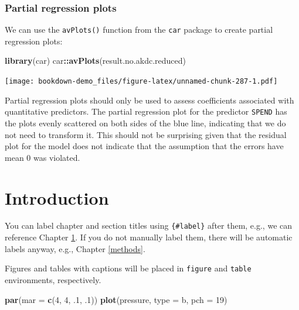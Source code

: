 \documentclass[
]{book}
\newenvironment{Shaded}{\begin{snugshade}}{\end{snugshade}}
\newcommand{\AttributeTok}[1]{\textcolor[rgb]{0.13,0.29,0.53}{#1}}
\newcommand{\DecValTok}[1]{\textcolor[rgb]{0.00,0.00,0.81}{#1}}
\newcommand{\FunctionTok}[1]{\textcolor[rgb]{0.13,0.29,0.53}{\textbf{#1}}}
\newcommand{\NormalTok}[1]{#1}
\newcommand{\SpecialCharTok}[1]{\textcolor[rgb]{0.81,0.36,0.00}{\textbf{#1}}}
\newcommand{\StringTok}[1]{\textcolor[rgb]{0.31,0.60,0.02}{#1}}
\begin{document}
\hypertarget{partial-regression-plots-1}{%
\subsection*{Partial regression plots}\label{partial-regression-plots-1}}

We can use the \texttt{avPlots()} function from the \texttt{car} package to create partial regression plots:

\begin{Shaded}
\begin{Highlighting}[]
\FunctionTok{library}\NormalTok{(car)}
\NormalTok{car}\SpecialCharTok{::}\FunctionTok{avPlots}\NormalTok{(result.no.akdc.reduced)}
\end{Highlighting}
\end{Shaded}

\texttt{[image: bookdown-demo\_files/figure-latex/unnamed-chunk-287-1.pdf]}

Partial regression plots should only be used to assess coefficients associated with quantitative predictors. The partial regression plot for the predictor \texttt{SPEND} has the plots evenly scattered on both sides of the blue line, indicating that we do not need to transform it. This should not be surprising given that the residual plot for the model does not indicate that the assumption that the errors have mean 0 was violated.

\hypertarget{intro}{%
\chapter{Introduction}\label{intro}}

You can label chapter and section titles using \texttt{\{\#label\}} after them, e.g., we can reference Chapter \ref{intro}. If you do not manually label them, there will be automatic labels anyway, e.g., Chapter \ref{methods}.

Figures and tables with captions will be placed in \texttt{figure} and \texttt{table} environments, respectively.

\begin{Shaded}
\begin{Highlighting}[]
\FunctionTok{par}\NormalTok{(}\AttributeTok{mar =} \FunctionTok{c}\NormalTok{(}\DecValTok{4}\NormalTok{, }\DecValTok{4}\NormalTok{, .}\DecValTok{1}\NormalTok{, .}\DecValTok{1}\NormalTok{))}
\FunctionTok{plot}\NormalTok{(pressure, }\AttributeTok{type =} \StringTok{\textquotesingle{}b\textquotesingle{}}\NormalTok{, }\AttributeTok{pch =} \DecValTok{19}\NormalTok{)}
\end{Highlighting}
\end{Shaded}
\end{document}
